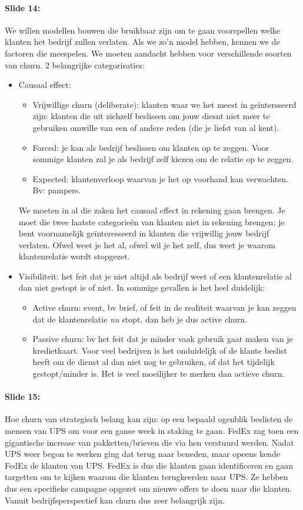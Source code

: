 \documentclass[10pt,a4paper]{report}
\begin{document}
\paragraph{Slide 14:}We willen modellen bouwen die bruikbaar zijn om te gaan voorspellen welke klanten het bedrijf zullen verlaten. Als we zo'n model hebben, kennen we de factoren die meespelen. We moeten aandacht hebben voor verschillende soorten van churn. 2 belangrijke categorisaties:
\begin{itemize}
\item Causaal effect: 
\begin{itemize}
\item Vrijwillige churn (deliberate): klanten waar we het meest in geïntersseerd zijn: klanten die uit zichzelf beslissen om jouw diesnt niet meer te gebruiken omwille van een of andere reden (die je liefst van al kent).
\item Forced: je kan als bedrijf beslissen om klanten op te zeggen. Voor sommige klanten zal je als bedrijf zelf kiezen om de relatie op te zeggen.
\item Expected: klantenverloop waarvan je het op voorhand kan verwachten. Bv: pampers.
\end{itemize}
We moeten in al die zaken het causaal effect in rekening gaan brengen. Je moet die twee laatste categorieën van klanten niet in rekening brengen; je bent voornamelijk geïnteresseerd in klanten die vrijwillig jouw bedrijf verlaten. Ofwel weet je het al, ofwel wil je het zelf, dus weet je waarom klantenrelatie wordt stopgezet.
\item Visibiliteit: het feit dat je niet altijd als bedrijf weet of een klantenrelatie al dan niet gestopt is of niet. In sommige gevallen is het heel duidelijk:
\begin{itemize}
\item Active churn: event, bv brief, of feit in de realiteit waarvan je kan zeggen dat de klantenrelatie \emph{nu} stopt, dan heb je dus active churn.
\item Passive churn: bv het feit dat je minder vaak gebruik gaat maken van je kredietkaart. Voor veel bedrijven is het onduidelijk of de klante beslist heeft om de dienst al dan niet nog te gebruiken, of dat het tijdelijk gestopt/minder is. Het is veel moeilijker te merken dan actieve churn.
\end{itemize}
\end{itemize}

\paragraph{Slide 15:}Hoe churn van strategisch belang kan zijn: op een bepaald ogenblik beslisten de mensen van UPS om voor een ganse week in staking te gaan. FedEx zag toen een gigantische increase van pakketten/brieven die via hen verstuurd werden. Nadat UPS weer begon te werken ging dat terug naar beneden, maar opeens kende FedEx de klanten van UPS. FedEx is dus die klanten gaan identificeren en gaan targetten om te kijken waarom die klanten terugkeerden naar UPS. Ze hebben dus een specifieke campagne opgezet om nieuwe offers te doen naar die klanten. Vanuit bedrijfsperspectief kan churn dus zeer belangrijk zijn.
\end{document}
